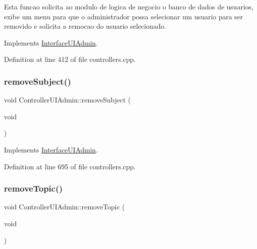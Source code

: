 Esta funcao solicita ao modulo de logica de negocio o banco de dados de usuarios, exibe um menu para que o administrador possa selecionar um usuario para ser removido e solicita a remocao do usuario selecionado. 

Implements \hyperlink{class_interface_u_i_admin_af9fdde1936eaa0bf7950c4ca98d44d74}{Interface\+U\+I\+Admin}.



Definition at line 412 of file controllers.\+cpp.

\mbox{\label{class_controller_u_i_admin_a7799d896fb475d2731843c6a67db3390}} 
\subsubsection{\texorpdfstring{remove\+Subject()}{removeSubject()}}
{\footnotesize\ttfamily void Controller\+U\+I\+Admin\+::remove\+Subject (\begin{DoxyParamCaption}\item[{void}]{ }\end{DoxyParamCaption})\hspace{0.3cm}{\ttfamily [virtual]}}



Implements \hyperlink{class_interface_u_i_admin_a812a7f43e1daaf95525e7c8b2b11676d}{Interface\+U\+I\+Admin}.



Definition at line 695 of file controllers.\+cpp.

\mbox{\label{class_controller_u_i_admin_aad9b0c9e945e3075bb8eb25b55378f27}} 
\subsubsection{\texorpdfstring{remove\+Topic()}{removeTopic()}}
{\footnotesize\ttfamily void Controller\+U\+I\+Admin\+::remove\+Topic (\begin{DoxyParamCaption}\item[{void}]{ }\end{DoxyParamCaption})\hspace{0.3cm}{\ttfamily [virtual]}}



